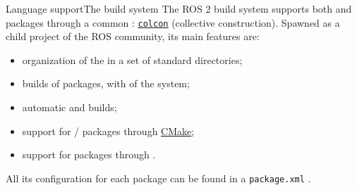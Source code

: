 \begin{frame}{Language support}{The build system}
  The ROS 2 build system supports both  and  packages through a common : \href{https://colcon.readthedocs.io/en/released/}{\color{blue}\underline{\texttt{colcon}}} (collective construction).
  \newline\newline
  Spawned as a child project of the ROS community, its main features are:
  \begin{itemize}
    \item organization of the  in a set of standard directories;
    \item {} builds of packages, with  of the system;
    \item automatic  and  builds;
    \item support for / packages through \href{https://cmake.org/}{\color{blue}\underline{CMake}};
    \item support for  packages through \href{https://setuptools.pypa.io/en/latest/}{}.
  \end{itemize}
  All its configuration for each package can be found in a \texttt{package.xml} .
\end{frame}
